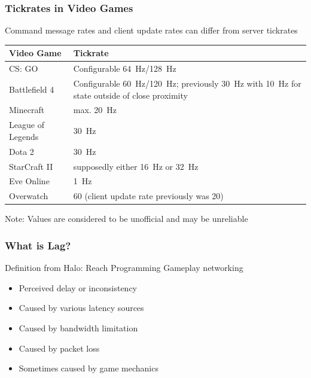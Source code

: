 \documentclass{UDEbeamerEN}
\begin{document}
\begin{frame}
	\frametitle{Tickrates in Video Games}

	\begin{center}
	Command message rates and client update rates can differ from server tickrates
	{\small
		\begin{tabu}{X[0.45]X}
			\toprule
			\textbf{Video Game} & \textbf{Tickrate} \\
			\midrule
			CS: GO & Configurable \SI{64}{\hertz}/\SI{128}{\hertz} \\
			Battlefield 4 & Configurable \SI{60}{\hertz}/\SI{120}{\hertz}; previously \SI{30}{\hertz} with \SI{10}{\hertz} for state outside of close proximity  \\
			Minecraft & max. \SI{20}{\hertz} \\
			League of Legends & \SI{30}{\hertz} \\
			Dota 2 & \SI{30}{\hertz} \\
			StarCraft II & supposedly either \SI{16}{\hertz} or \SI{32}{\hertz} \\
			Eve Online & \SI{1}{\hertz} \\
			Overwatch & 60 (client update rate previously was 20) \\
			\bottomrule
		\end{tabu}}

	Note: Values are considered to be unofficial and may be unreliable

	\end{center}

\end{frame}


\begin{frame}
	\frametitle{What is Lag?}
		Definition from Halo: Reach Programming Gameplay networking
	\begin{itemize}
		\item Perceived delay or inconsistency
		\item Caused by various latency sources
		\item Caused by bandwidth limitation
		\item Caused by packet loss
		\item Sometimes  caused by game mechanics
	\end{itemize}
\end{frame}
\end{document}
